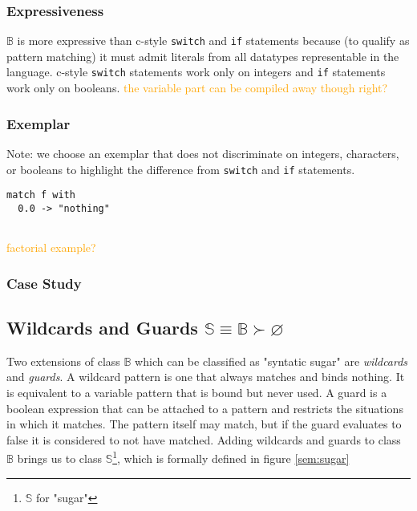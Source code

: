 \documentclass[acmsmall]{acmart}
\renewcommand\todo[1]{\textcolor{orange}{#1}}
\begin{document}
\subsubsection{Expressiveness}
$\mathbb{B}$ is more expressive than c-style \lstinline{switch} and \lstinline{if} statements because (to qualify as pattern matching) it must admit literals from all datatypes representable in the language.  c-style \lstinline{switch} statements work only on integers and \lstinline{if} statements work only on booleans.  \todo{the variable part can be compiled away though right?}

\subsubsection{Exemplar}

Note: we choose an exemplar that does not discriminate on integers, characters, or booleans to highlight the difference from \lstinline{switch} and \lstinline{if} statements.  
\begin{lstlisting}
match f with
  0.0 -> "nothing"
  
\end{lstlisting}

\todo{factorial example?}

\subsubsection{Case Study}

\subsection{Wildcards and Guards $\mathbb{S} \equiv \mathbb{B} \succ \varnothing$}
Two extensions of class $\mathbb{B}$ which can be classified as "syntatic sugar" are \emph{wildcards} and \emph{guards}.  A wildcard pattern is one that always matches and binds nothing.  It is equivalent to a variable pattern that is bound but never used.  A guard is a boolean expression that can be attached to a pattern and restricts the situations in which it matches.  The pattern itself may match, but if the guard evaluates to false it is considered to not have matched.  Adding wildcards and guards to class $\mathbb{B}$ brings us to class $\mathbb{S}$\footnote{$\mathbb{S}$ for "sugar"}, which is formally defined in figure \ref{sem:sugar}
\end{document}
